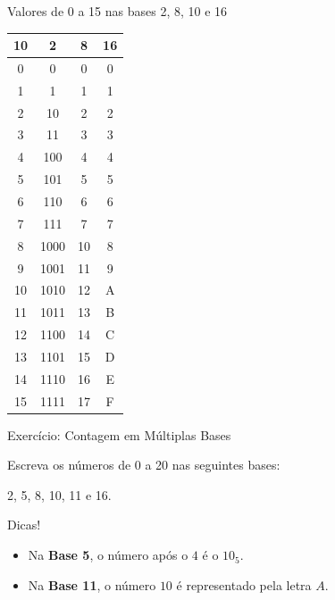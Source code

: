 \begin{frame}{Valores de 0 a 15 nas bases 2, 8, 10 e 16}
    \begin{table}[h]
        \begin{center}
            \begin{tabular}{|c|c|c|c|}
                \hline
                10 & 2    & 8  & 16 \\
                \hline
                0  & 0    & 0  & 0  \\
                1  & 1    & 1  & 1  \\
                2  & 10   & 2  & 2  \\
                3  & 11   & 3  & 3  \\
                4  & 100  & 4  & 4  \\
                5  & 101  & 5  & 5  \\
                6  & 110  & 6  & 6  \\
                7  & 111  & 7  & 7  \\
                8  & 1000 & 10 & 8  \\
                9  & 1001 & 11 & 9  \\
                10 & 1010 & 12 & A  \\
                11 & 1011 & 13 & B  \\
                12 & 1100 & 14 & C  \\
                13 & 1101 & 15 & D  \\
                14 & 1110 & 16 & E  \\
                15 & 1111 & 17 & F  \\
                \hline
            \end{tabular}
        \end{center}
    \end{table}
\end{frame}

\begin{frame}{Exercício: Contagem em Múltiplas Bases}

    Escreva os números de 0 a 20 nas seguintes bases:

    2, 5, 8, 10, 11 e 16.

    \vspace{0.3cm}
    \begin{alertblock}{Dicas!}
        \begin{itemize}
            \item Na \textbf{Base 5}, o número após o $4$ é o $10_5$.
            \item Na \textbf{Base 11}, o número $10$ é representado pela letra $A$.
        \end{itemize}
    \end{alertblock}
\end{frame}

